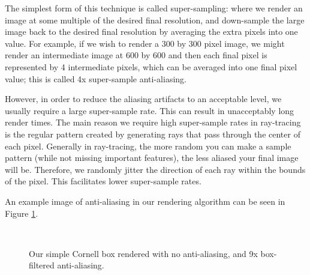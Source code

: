 The simplest form of this technique is called super-sampling: where we render an image at some multiple of the desired final resolution, and down-sample the large image back to the desired final resolution by averaging the extra pixels into one value. For example, if we wish to render a 300 by 300 pixel image, we might render an intermediate image at 600 by 600 and then each final pixel is represented by 4 intermediate pixels, which can be averaged into one final pixel value; this is called 4x super-sample anti-aliasing.

However, in order to reduce the aliasing artifacts to an acceptable level, we usually require a large super-sample rate. This can result in unacceptably long render times. The main reason we require high super-sample rates in ray-tracing is the regular pattern  created by generating rays that pass through the center of each pixel. Generally in ray-tracing, the more random you can make a sample pattern (while not missing important features), the less aliased your final image will be. Therefore, we randomly jitter the direction of each ray within the bounds of the pixel. This facilitates lower super-sample rates.

An example image of anti-aliasing in our rendering algorithm can be seen in Figure \ref{fig:anti-aliasing}.

\begin{figure}[h!]
    \centering
    ~
    \caption[Anti-aliasing comparison]{Our simple Cornell box rendered with no anti-aliasing, and 9x box-filtered anti-aliasing.}
    \label{fig:anti-aliasing}
\end{figure}

